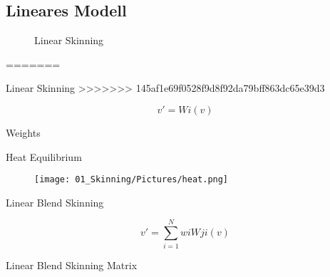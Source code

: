 \subsection{Lineares Modell}
	\begin{frame}{
			\begin{figure}
				\colorbox{black!10}{\Huge{Linear Skinning}}
			\end{figure}
		}
=======

	\begin{frame}{\Huge{Linear Skinning}}
>>>>>>> 145af1e69f0528f9d8f92da79bff863dc65e39d3
		
		$$v'=Wi(v)$$
		
		
	\end{frame}

{ %
	\begin{frame}{\Huge{Weights}}
		
		
		
		
	\end{frame}
} %

	\begin{frame}{\Huge{Heat Equilibrium}}
		
		\begin{figure}
			\texttt{[image: 01\_Skinning/Pictures/heat.png]}
		\end{figure}
		
		
		
	\end{frame}
	
	\begin{frame}{\Huge{Linear Blend Skinning}}
		
		$$v'=\sum_{i=1}^{N}wiWji(v)$$
		
		
	\end{frame}
	
		\begin{frame}{\Huge{Linear Blend Skinning Matrix}}
			

\end{frame}
\end{frame}
